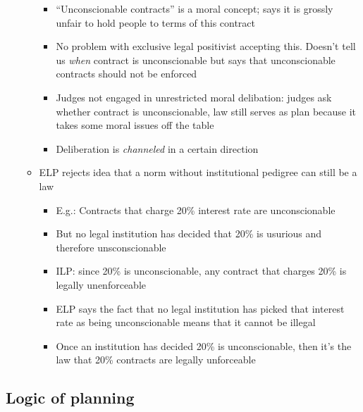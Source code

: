 \begin{itemize}
\begin{itemize}
    \begin{itemize}
    \tightlist
    \item
      ``Unconscionable contracts'' is a moral concept; says it is
      grossly unfair to hold people to terms of this contract
    \item
      No problem with exclusive legal positivist accepting this. Doesn't
      tell us \emph{when} contract is unconscionable but says that
      unconscionable contracts should not be enforced
    \item
      Judges not engaged in unrestricted moral delibation: judges ask
      whether contract is unconscionable, law still serves as plan
      because it takes some moral issues off the table
    \item
      Deliberation is \emph{channeled} in a certain direction
    \end{itemize}
  \item
    ELP rejects idea that a norm without institutional pedigree can
    still be a law

    \begin{itemize}
    \tightlist
    \item
      E.g.: Contracts that charge 20\% interest rate are unconscionable
    \item
      But no legal institution has decided that 20\% is usurious and
      therefore unsconscionable
    \item
      ILP: since 20\% is unconscionable, any contract that charges 20\%
      is legally unenforceable
    \item
      ELP says the fact that no legal institution has picked that
      interest rate as being unconscionable means that it cannot be
      illegal
    \item
      Once an institution has decided 20\% is unconscionable, then it's
      the law that 20\% contracts are legally unforceable
    \end{itemize}
  \end{itemize}
\end{itemize}

\hypertarget{logic-of-planning}{%
\subsection{Logic of planning}\label{logic-of-planning}}

